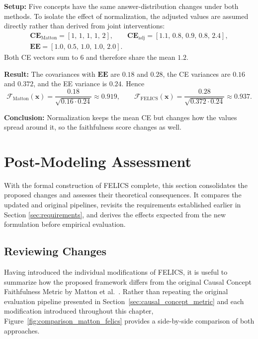 \begin{example_box}[label=ex:payout_normalization_correlation]
	\textbf{Setup:} Five concepts have the same answer-distribution changes under both methods. To isolate the effect of normalization, the adjusted values are assumed directly rather than derived from joint interventions:
	\begin{gather*}
		\mathbf{CE}_{\mathrm{Matton}}=[1,\,1,\,1,\,1,\,2], \qquad \mathbf{CE}_{\mathrm{adj}}=[1.1,\,0.8,\,0.9,\,0.8,\,2.4], \\
		\mathbf{EE}=[1.0,\,0.5,\,1.0,\,1.0,\,2.0].
	\end{gather*}
	Both CE vectors sum to $6$ and therefore share the mean $1.2$.

	\smallskip
	\textbf{Result:} The covariances with $\mathbf{EE}$ are $0.18$ and $0.28$, the CE variances are $0.16$ and $0.372$, and the EE variance is $0.24$. Hence
	\begin{equation*}
		\mathcal{F}_{\mathrm{Matton}}(\mathbf{x})=\frac{0.18}{\sqrt{0.16\cdot 0.24}}\approx 0.919, \qquad
		\mathcal{F}_{\mathrm{FELICS}}(\mathbf{x})=\frac{0.28}{\sqrt{0.372\cdot 0.24}}\approx 0.937.
	\end{equation*}

	\textbf{Conclusion:} Normalization keeps the mean CE but changes how the values spread around it, so the faithfulness score changes as well.
\end{example_box}

\section{Post-Modeling Assessment}
With the formal construction of FELICS complete, this section consolidates the proposed changes and assesses their theoretical consequences. It compares the updated and original pipelines, revisits the requirements established earlier in Section \ref{sec:requirements}, and derives the effects expected from the new formulation before empirical evaluation.

\subsection{Reviewing Changes}

Having introduced the individual modifications of FELICS, it is useful to summarize how the proposed framework differs from the original Causal Concept Faithfulness Metric by Matton et al.~\cite{mattonWalkTalkMeasuring2024}. Rather than repeating the original evaluation pipeline presented in Section~\ref{sec:causal_concept_metric} and each modification introduced throughout this chapter, Figure~\ref{fig:comparison_matton_felics} provides a side-by-side comparison of both approaches.

